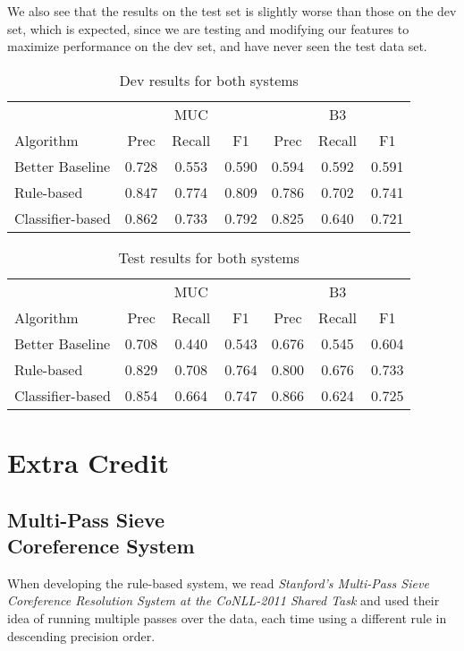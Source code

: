 \documentclass[12pt, twocolumn]{article}
\begin{document}
We also see that the results on the test set is slightly worse than those on the dev set, which is expected, since we are testing and modifying our features to maximize performance on the dev set, and have never seen the test data set.
\begin{table}[H]
\begin{minipage}{\textwidth}
\centering
\begin{tabular}{l|c c c|c c c}
\hline
& & MUC & & & B3 & \\
Algorithm & Prec & Recall & F1 & Prec & Recall & F1 \\\hline
Better Baseline & 0.728 & 0.553 & 0.590 & 0.594 & 0.592 & 0.591 \\\hline
Rule-based & 0.847 & 0.774 & 0.809 & 0.786 & 0.702 & 0.741 \\\hline  
Classifier-based & 0.862 & 0.733 & 0.792 & 0.825 & 0.640 & 0.721 \\\hline
\end{tabular}
\caption{Dev results for both systems}\label{tab:devresults}
\end{minipage}
\end{table}
\begin{table}[H]
\begin{minipage}{\textwidth}
\centering
\begin{tabular}{l|c c c|c c c}
\hline
& & MUC & & & B3 & \\
Algorithm & Prec & Recall & F1 & Prec & Recall & F1 \\\hline
Better Baseline & 0.708 & 0.440 & 0.543 & 0.676 & 0.545 & 0.604 \\\hline
Rule-based & 0.829 & 0.708 & 0.764 & 0.800 & 0.676 & 0.733 \\\hline  
Classifier-based & 0.854 & 0.664 & 0.747 & 0.866 & 0.624 & 0.725 \\\hline
\end{tabular}
\caption{Test results for both systems}\label{tab:testresults}
\end{minipage}
\end{table}
\section{Extra Credit}
\subsection{Multi-Pass Sieve \\Coreference System}
When developing the rule-based system, we read 
\textit{Stanford’s Multi-Pass Sieve Coreference Resolution System at the CoNLL-2011 Shared Task} and used their idea of running multiple passes over the data, each time using a different rule in descending precision order.
\end{document}
